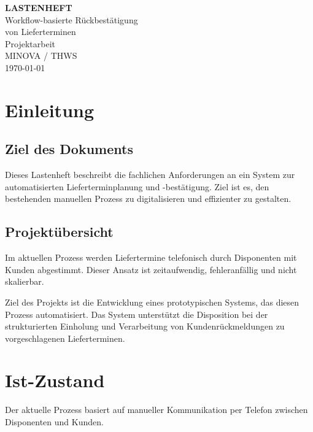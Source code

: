 \documentclass[12pt,a4paper]{article}
\begin{document}
\begin{titlepage}
    \centering

    \vspace*{3cm}

    {\Huge \textbf{LASTENHEFT}}\\[1.5cm]

    {\LARGE Workflow-basierte Rückbestätigung}\\[0.3cm]
    {\LARGE von Lieferterminen}\\[3cm]

    {\Large Projektarbeit}\\[2cm]

    {\large
    MINOVA / THWS
    }\\[1cm]

    {\large
    \today
    }

    \vfill

\end{titlepage}
\tableofcontents
\newpage

\section{Einleitung}
\subsection{Ziel des Dokuments}
Dieses Lastenheft beschreibt die fachlichen Anforderungen an ein System zur automatisierten Lieferterminplanung und -bestätigung. Ziel ist es, den bestehenden manuellen Prozess zu digitalisieren und effizienter zu gestalten.

\subsection{Projektübersicht}
Im aktuellen Prozess werden Liefertermine telefonisch durch Disponenten mit Kunden abgestimmt. Dieser Ansatz ist zeitaufwendig, fehleranfällig und nicht skalierbar.

Ziel des Projekts ist die Entwicklung eines prototypischen Systems, das diesen Prozess automatisiert. Das System unterstützt die Disposition bei der strukturierten Einholung und Verarbeitung von Kundenrückmeldungen zu vorgeschlagenen Lieferterminen.
\section{Ist-Zustand}
Der aktuelle Prozess basiert auf manueller Kommunikation per Telefon zwischen Disponenten und Kunden.
\end{document}
